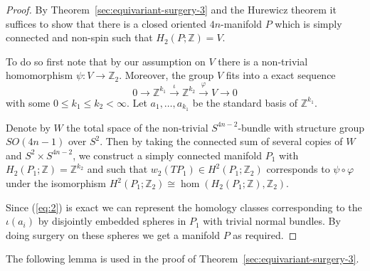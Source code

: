 \documentclass[a4paper, 11pt]{amsart}
\theoremstyle{definition}
\theoremstyle{remark}
\numberwithin{equation}{section}
\begin{document}
\begin{proof}
By Theorem~\ref{sec:equivariant-surgery-3} and the Hurewicz theorem it suffices to show that there is a closed oriented \(4n\)-manifold \(P\) which is simply connected and non-spin such that \(H_2(P;\mathbb{Z})=V\).

  To do so first note that by our assumption on \(V\) there is a non-trivial homomorphism \(\psi:V\rightarrow \mathbb{Z}_2\).
  Moreover, the group \(V\) fits into a exact sequence
  \begin{equation}
    \label{eq:2}
    0\rightarrow \mathbb{Z}^{k_1}\stackrel{\iota}{\rightarrow} \mathbb{Z}^{k_2}\stackrel{\varphi}{\rightarrow} V\rightarrow 0
  \end{equation}
  with some \(0\leq k_1\leq k_2<\infty\).
  Let \(a_{1},\dots,a_{k_1}\) be the standard basis of \(\mathbb{Z}^{k_1}\).

  Denote by \(W\) the total space of the non-trivial \(S^{4n-2}\)-bundle with structure group \(SO(4n-1)\) over \(S^2\).
  Then by taking the connected sum of several copies of \(W\) and \(S^2\times S^{4n-2}\), we construct a simply connected manifold \(P_1\) with \(H_2(P_1;\mathbb{Z})=\mathbb{Z}^{k_2}\) and such that \(w_2(TP_1)\in H^2(P_1;\mathbb{Z}_2)\) corresponds to \(\psi\circ \varphi\) under the isomorphism \(H^2(P_1;\mathbb{Z}_2)\cong \hom(H_2(P_1;\mathbb{Z}),\mathbb{Z}_2)\).

  Since (\ref{eq:2}) is exact we can represent the homology classes corresponding to the \(\iota(a_i)\) by disjointly embedded spheres in \(P_1\) with trivial normal bundles.
  By doing surgery on these spheres we get a manifold \(P\) as required.
\end{proof}


The following lemma is used in the proof of Theorem~\ref{sec:equivariant-surgery-3}.
\end{document}

